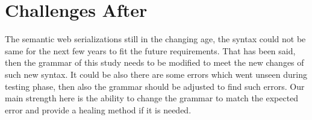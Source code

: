 \section{Challenges After }
The semantic web serializations still in the changing age, the syntax could not be same for the next few years to fit the future requirements. That has been said, then the grammar of this study needs to be modified to meet the new changes of such new syntax. 
It could be also there are some errors which went unseen during testing phase, then also the grammar should be adjusted to find such errors. Our main strength here is the ability to change the grammar to match the expected error and provide a healing method if it is needed.   